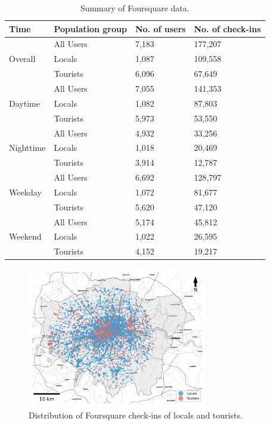 \documentclass{article}
\theoremstyle{remark}
\begin{document}
\begin{table}[h!]
\centering
\caption{\label{tab:foursquare_summary}Summary of Foursquare data.}
\begin{tabular}{llll} \hline
Time & Population group & No. of users & No. of check-ins \\
\hline
\multirow{3}{*}{Overall} 
& All Users & 7,183 & 177,207 \\
& Locals & 1,087 & 109,558 \\
& Tourists & 6,096 & 67,649 \\
\hline
\multirow{3}{*}{Daytime} 
& All Users & 7,055 & 141,353 \\
& Locals & 1,082 & 87,803 \\
& Tourists & 5,973 & 53,550 \\
\hline
\multirow{3}{*}{Nighttime} 
& All Users & 4,932 & 33,256 \\
& Locals & 1,018 & 20,469 \\
& Tourists & 3,914 & 12,787 \\
\hline
\multirow{3}{*}{Weekday} 
& All Users & 6,692 & 128,797 \\
& Locals & 1,072 & 81,677 \\
& Tourists & 5,620 & 47,120 \\
\hline
\multirow{3}{*}{Weekend} 
& All Users & 5,174 & 45,812 \\
& Locals & 1,022 & 26,595 \\
& Tourists & 4,152 & 19,217 \\
\hline
\end{tabular}
\end{table}


\begin{figure}[h!]
\centering
\includegraphics[width=0.7\textwidth]{figures/foursquare_distribution.png}
\caption{\label{fig:foursquare_distribution}Distribution of Foursquare check-ins of locals and tourists.}
\end{figure}
\end{document}
